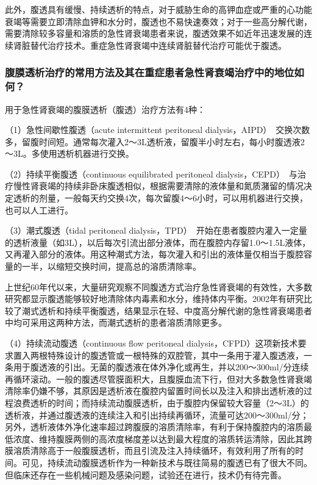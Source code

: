 此外，腹透具有缓慢、持续透析的特点，对于威胁生命的高钾血症或严重的心功能衰竭等需要立即清除血钾和水分时，腹透也不易快速奏效；对于一些高分解代谢，需要清除较多容量和溶质的急性肾衰竭患者来说，腹透效果不如近年迅速发展的连续肾脏替代治疗技术。重症急性肾衰竭中连续肾脏替代治疗可能优于腹透。

\subsubsection{腹膜透析治疗的常用方法及其在重症患者急性肾衰竭治疗中的地位如何？}

用于急性肾衰竭的腹膜透析（腹透）治疗方法有4种：

（1）急性间歇性腹透（acute intermittent peritoneal
dialysis，AIPD）　交换次数多，留腹时间短。通常每次灌入2～3L透析液，留腹半小时左右，每小时腹透液2～3L。多使用透析机器进行交换。

（2）持续平衡腹透（continuous equilibrated peritoneal
dialysis，CEPD）　与治疗慢性肾衰竭的持续非卧床腹透相似，根据需要清除的液体量和氮质潴留的情况决定透析的剂量，一般每天约交换4次，每次留腹4～6小时，可以用机器进行交换，也可以人工进行。

（3）潮式腹透（tidal peritoneal
dialysis，TPD）　开始在患者腹腔内灌入一定量的透析液量（如3L），以后每次引流出部分液体，而在腹腔内存留1.0～1.5L液体，又再灌入部分的液体。用这种潮式方法，每次灌入和引出的液体量仅相当于腹腔容量的一半，以缩短交换时间，提高总的溶质清除率。

上世纪60年代以来，大量研究观察不同腹透方式治疗急性肾衰竭的有效性，大多数研究都显示腹透能够较好地清除体内毒素和水分，维持体内平衡。2002年有研究比较了潮式透析和持续平衡腹透，结果显示在轻、中度高分解代谢的急性肾衰竭患者中均可采用这两种方法，而潮式透析的患者溶质清除更多。

（4）持续流动腹透（continuous flow peritoneal
dialysis，CFPD）这项新技术要求置入两根特殊设计的腹透管或一根特殊的双腔管，其中一条用于灌入腹透液，一条用于腹透液的引出。无菌的腹透液在体外净化或再生，并以200～300ml/分连续再循环滚动。一般的腹透尽管膜面积大，且腹膜血流下行，但对大多数急性肾衰竭清除率仍嫌不够，其原因是透析液在腹腔内留置时间长以及注入和排出透析液的过程浪费透析的时间；而持续流动腹膜透析，由于腹腔内保留较大容量（2～3L）的透析液，并通过腹透液的连续注入和引出持续再循环，流量可达200～300ml/分；另外，透析液体外净化速率超过跨腹膜的溶质清除率，有利于保持腹腔内的溶质最低浓度、维持腹膜两侧的高浓度梯度差以达到最大程度的溶质转运清除，因此其跨膜溶质清除高于一般腹膜透析，而且引流及注入持续循环，有效利用了所有的时间。可见，持续流动腹膜透析作为一种新技术与既往简易的腹透已有了很大不同。但临床还存在一些机械问题及感染问题，试验还在进行，技术仍有待完善。

